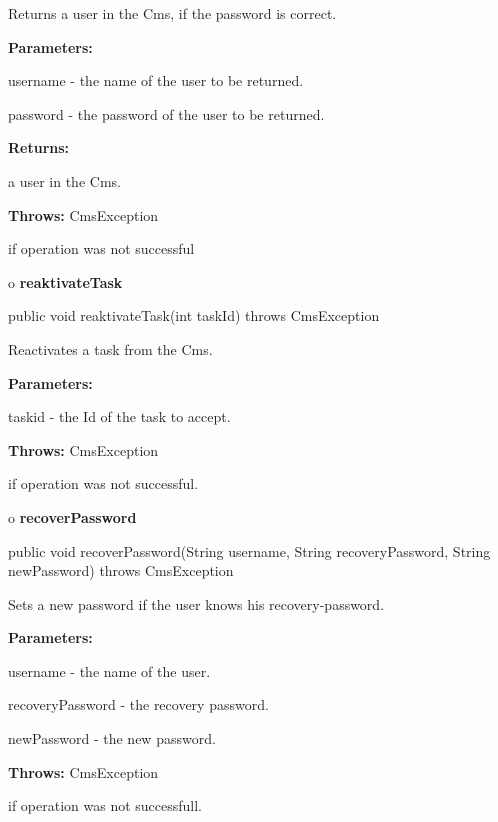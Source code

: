 \begin{description}
\htmlDD Returns a user in the Cms, if the password is correct.

\begin{description}
\item {\bf Parameters:}

username - the name of the user to be returned.

password - the password of the user to be returned.
\item {\bf Returns:}

a user in the Cms.
\item {\bf Throws:} CmsException

if operation was not successful
\end{description}

\end{description}

o {\bf reaktivateTask}

\begin{PRE}
 public void reaktivateTask(int taskId) throws CmsException
\end{PRE}

\begin{description}
\htmlDD Reactivates a task from the Cms.

\begin{description}
\item {\bf Parameters:}

taskid - the Id of the task to accept.
\item {\bf Throws:} CmsException

if operation was not successful.
\end{description}

\end{description}

o {\bf recoverPassword}

\begin{PRE}
 public void recoverPassword(String username,
                             String recoveryPassword,
                             String newPassword) throws CmsException
\end{PRE}

\begin{description}
\htmlDD Sets a new password if the user knows his recovery-password.

\begin{description}
\item {\bf Parameters:}

username - the name of the user.

recoveryPassword - the recovery password.

newPassword - the new password.
\item {\bf Throws:} CmsException

if operation was not successfull.
\end{description}

\end{description}

